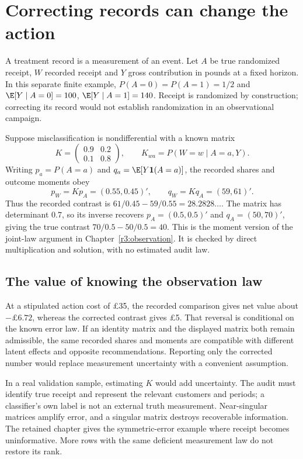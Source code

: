 \chapter{Correcting records can change the action}
\label{rewrite:observation}

A treatment record is a measurement of an event. Let $A$ be true randomized
receipt, $W$ recorded receipt and $Y$ gross contribution in pounds at a
fixed horizon. In this separate finite example, $P(A=0)=P(A=1)=1/2$
and $\E[Y\mid A=0]=100$, $\E[Y\mid A=1]=140$. Receipt is
randomized by construction; correcting its record would not establish
randomization in an observational campaign.

Suppose misclassification is nondifferential with a known matrix
\[
 K=\begin{pmatrix}0.9&0.2\\0.1&0.8\end{pmatrix},
 \qquad K_{wa}=P(W=w\mid A=a,Y).
\]
Writing $p_a=P(A=a)$ and $q_a=\E[Y\mathbf1(A=a)]$, the recorded
shares and outcome moments obey
\[
 p_W=Kp_A=(0.55,0.45)' ,\qquad q_W=Kq_A=(59,61)' .
\]
Thus the recorded contrast is $61/0.45-59/0.55=28.2828\ldots$.
The matrix has determinant $0.7$, so its inverse recovers
$p_A=(0.5,0.5)'$ and $q_A=(50,70)'$, giving the true contrast
$70/0.5-50/0.5=40$. This is the moment version of the joint-law
argument in Chapter~\ref{r3:observation}. It is checked by direct
multiplication and solution, with no estimated audit law.

\section{The value of knowing the observation law}
At a stipulated action cost of \pounds35, the recorded comparison gives
net value about $-\pounds6.72$, whereas the corrected contrast gives
\pounds5. That reversal is conditional on the known error law. If an
identity matrix and the displayed matrix both remain admissible, the same
recorded shares and moments are compatible with different latent effects
and opposite recommendations. Reporting only the corrected number would
replace measurement uncertainty with a convenient assumption.

In a real validation sample, estimating $K$ would add uncertainty. The audit
must identify true receipt and represent the relevant customers and periods;
a classifier's own label is not an external truth measurement. Near-singular
matrices amplify error, and a singular matrix destroys recoverable information.
The retained chapter gives the symmetric-error example where receipt becomes
uninformative. More rows with the same deficient measurement law do not
restore its rank.

